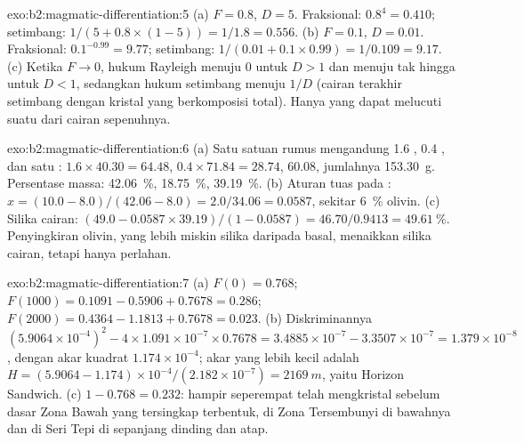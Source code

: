 \begin{solution}{exo:b2:magmatic-differentiation:5}
(a) $F = 0.8$, $D = 5$. Fraksional: $0.8^{4} = 0.410$; setimbang:
$1/(5 + 0.8\times(1 - 5)) = 1/1.8 = 0.556$. (b) $F = 0.1$, $D = 0.01$. Fraksional:
$0.1^{-0.99} = 9.77$; setimbang: $1/(0.01 + 0.1\times0.99) = 1/0.109 = 9.17$.
(c) Ketika $F \to 0$, hukum Rayleigh menuju $0$ untuk $D > 1$ dan menuju tak hingga untuk
$D < 1$, sedangkan hukum setimbang menuju $1/D$ (cairan terakhir setimbang
dengan kristal yang berkomposisi total). Hanya  yang dapat melucuti suatu
 dari cairan sepenuhnya.
\end{solution}

\begin{solution}{exo:b2:magmatic-differentiation:6}
(a) Satu satuan rumus mengandung 1.6 , 0.4 , dan satu : $1.6\times
40.30 = 64.48$, $0.4\times71.84 = 28.74$, 60.08, jumlahnya \qty{153.30}{g}. Persentase
massa:  \qty{42.06}{\percent},  \qty{18.75}{\percent},
 \qty{39.19}{\percent}. (b) Aturan tuas pada : $x = (10.0 - 8.0)/(42.06
- 8.0) = 2.0/34.06 = 0.0587$, sekitar \qty{6}{\percent} olivin. (c) Silika
cairan: $(49.0 - 0.0587\times39.19)/(1 - 0.0587) = 46.70/0.9413 =
\qty{49.61}{\percent}$. Penyingkiran olivin, yang lebih miskin silika daripada basal, menaikkan
silika cairan, tetapi hanya perlahan.
\end{solution}

\begin{solution}{exo:b2:magmatic-differentiation:7}
(a) $F(0) = 0.768$; $F(1000) = 0.1091 - 0.5906 + 0.7678 = 0.286$; $F(2000) = 0.4364
- 1.1813 + 0.7678 = 0.023$. (b) Diskriminannya $(5.9064\times10^{-4})^2 -
4\times1.091\times10^{-7}\times0.7678 = 3.4885\times10^{-7} - 3.3507\times10^{-7} =
1.379\times10^{-8}$, dengan akar kuadrat $1.174\times10^{-4}$; akar yang lebih kecil adalah
$H = (5.9064 - 1.174)\times10^{-4}/(2.182\times10^{-7}) = \qty{2169}{m}$, yaitu
Horizon Sandwich. (c) $1 - 0.768 = 0.232$: hampir seperempat  telah
mengkristal sebelum dasar Zona Bawah yang tersingkap terbentuk, di Zona Tersembunyi
di bawahnya dan di Seri Tepi di sepanjang dinding dan atap.
\end{solution}

